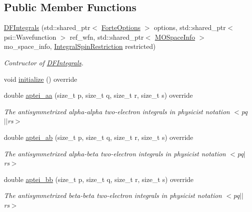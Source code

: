 \subsection*{Public Member Functions}
\begin{DoxyCompactItemize}
\item 
\mbox{\hyperlink{classforte_1_1_d_f_integrals_a3475865749b607888cd8306e2d8c1f08}{D\+F\+Integrals}} (std\+::shared\+\_\+ptr$<$ \mbox{\hyperlink{classforte_1_1_forte_options}{Forte\+Options}} $>$ options, std\+::shared\+\_\+ptr$<$ psi\+::\+Wavefunction $>$ ref\+\_\+wfn, std\+::shared\+\_\+ptr$<$ \mbox{\hyperlink{classforte_1_1_m_o_space_info}{M\+O\+Space\+Info}} $>$ mo\+\_\+space\+\_\+info, \mbox{\hyperlink{namespaceforte_a7defa2660dd3eb07aa81176b90781be7}{Integral\+Spin\+Restriction}} restricted)
\begin{DoxyCompactList}\small\item\em Contructor of \mbox{\hyperlink{classforte_1_1_d_f_integrals}{D\+F\+Integrals}}. \end{DoxyCompactList}\item 
void \mbox{\hyperlink{classforte_1_1_d_f_integrals_a8488339b2eff7dea6e98e29e9bf55a97}{initialize}} () override
\item 
double \mbox{\hyperlink{classforte_1_1_d_f_integrals_aa495745fe55286ec7b4ff10ec6d22fae}{aptei\+\_\+aa}} (size\+\_\+t p, size\+\_\+t q, size\+\_\+t r, size\+\_\+t s) override
\begin{DoxyCompactList}\small\item\em The antisymmetrixed alpha-\/alpha two-\/electron integrals in physicist notation $<$pq$\vert$$\vert$rs$>$ \end{DoxyCompactList}\item 
double \mbox{\hyperlink{classforte_1_1_d_f_integrals_a01ec88efadb6b8b28bae6c5c3fbfd389}{aptei\+\_\+ab}} (size\+\_\+t p, size\+\_\+t q, size\+\_\+t r, size\+\_\+t s) override
\begin{DoxyCompactList}\small\item\em The antisymmetrixed alpha-\/beta two-\/electron integrals in physicist notation $<$pq$\vert$rs$>$ \end{DoxyCompactList}\item 
double \mbox{\hyperlink{classforte_1_1_d_f_integrals_ac9c2cb326b43623cbb290f7d6e1738cb}{aptei\+\_\+bb}} (size\+\_\+t p, size\+\_\+t q, size\+\_\+t r, size\+\_\+t s) override
\begin{DoxyCompactList}\small\item\em The antisymmetrixed beta-\/beta two-\/electron integrals in physicist notation $<$pq$\vert$$\vert$rs$>$ \end{DoxyCompactList}\item 

\end{DoxyCompactItemize}
